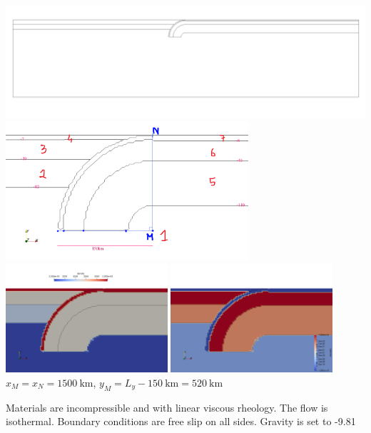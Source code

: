 \begin{center}
\includegraphics[width=14cm]{python_codes/fieldstone_67/images/setup01}\\
\includegraphics[width=9cm]{python_codes/fieldstone_67/images/setup02}\\
\includegraphics[width=6cm]{python_codes/fieldstone_67/images/setup03}
\includegraphics[width=6cm]{python_codes/fieldstone_67/images/setup04}\\
{\captionfont $x_M=x_N=1500~\si{\km}$, $y_M=L_y-150~\si{\km}=520~\si{\km}$}
\end{center}

Materials are incompressible and with linear viscous rheology. The
flow is isothermal. Boundary conditions are free slip on all
sides. Gravity is set to -9.81

